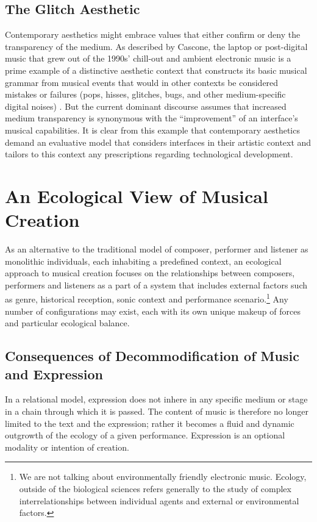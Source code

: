 \subsection{The Glitch Aesthetic}
\label{Gurevich:sub:3_4}
Contemporary aesthetics might embrace values that either confirm or deny the transparency of the medium. As described by Cascone, the laptop or post-digital music that grew out of the 1990s' chill-out and ambient electronic music is a prime example of a distinctive aesthetic context that constructs its basic musical grammar from musical events that would in other contexts be considered mistakes or failures (pops, hisses, glitches, bugs, and other medium-specific digital noises) \cite{Cascone:2000}. But the current dominant discourse assumes that increased medium transparency is synonymous with the ``improvement'' of an interface's musical capabilities. It is clear from this example that contemporary aesthetics demand an evaluative model that considers interfaces in their artistic context and tailors to this context any prescriptions regarding technological development.

\section{An Ecological View of Musical Creation}

As an alternative to the traditional model of composer, performer and listener as monolithic individuals, each inhabiting a predefined context, an ecological approach to musical creation focuses on the relationships between composers, performers and listeners as a part of a system that includes external factors such as genre, historical reception, sonic context and performance scenario.\footnote{We are not talking about environmentally friendly electronic music. Ecology, outside of the biological sciences refers generally to the study of complex interrelationships between individual agents and external or environmental factors.} Any number of configurations may exist, each with its own unique makeup of forces and particular ecological balance.

\subsection{Consequences of Decommodification of Music and Expression}
\label{Gurevich:sub:4_1}
In a relational model, expression does not inhere in any specific medium or stage in a chain through which it is passed. The content of music is therefore no longer limited to the text and the expression; rather it becomes a fluid and dynamic outgrowth of the ecology of a given performance. Expression is an optional modality or intention of creation.

